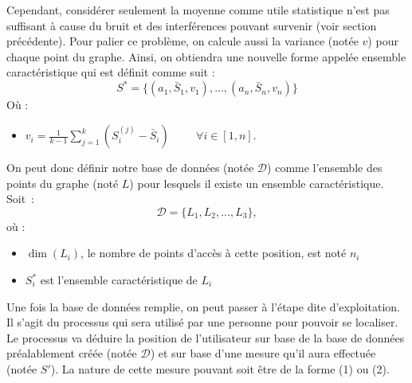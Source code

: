 \documentclass[11pt,journal,compsoc]{IEEEtran}
\begin{document}
		Cependant, considérer seulement la moyenne comme utile statistique n'est pas suffisant à cause du bruit et des interférences pouvant survenir (voir section précédente).
		Pour palier ce problème, on calcule aussi la variance (notée $v$) pour chaque point du graphe. Ainsi, on obtiendra une nouvelle forme appelée ensemble caractéristique
		qui est définit comme suit :
        \begin{equation}
          S^{*} = \{(a_{1}, \bar{S}_{1}, v_{1}), ..., (a_{n}, \bar{S}_{n}, v_{n})\}
        \end{equation}
        Où :
        \begin{itemize}
          \item $v_{i} = \frac{1}{k-1}\sum\limits_{j = 1}^{k}(S_{i}^{(j)}-\bar{S}_{i}) \hspace{1cm} \forall i \in [1,n]$.
        \end{itemize}
        On peut donc définir notre base de données (notée $\mathcal{D}$) comme l'ensemble des points du graphe (noté $L$) pour lesquels il existe un ensemble caractéristique.
		Soit~:
        \begin{equation}
          \mathcal{D} = \{L_{1}, L_{2}, ..., L_{3}\},
        \end{equation}
        où :
        \begin{itemize}
          \item $\dim(L_{i})$, le nombre de points d'accès à cette position, est noté $n_{i}$
          \item $S_{i}^{*}$ est l'ensemble caractéristique de $L_{i}$
        \end{itemize}

        Une fois la base de données remplie, on peut passer à l'étape dite d'exploitation. Il s'agit du processus qui sera utilisé par une personne pour pouvoir se localiser.
        Le processus va déduire la position de l'utilisateur sur base de la base de données préalablement créée (notée $\mathcal{D}$) et sur base d'une mesure qu'il aura effectuée
		(notée $S'$). La nature de cette mesure pouvant soit être de la forme (1) ou (2).
\end{document}

